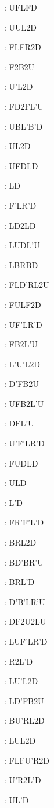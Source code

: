 \documentclass[9pt]{article}
\begin{document}
{\begin{multicols}{6}
: UFLFD

: UUL2D

: FLFR2D

: F2B2U

: U'L2D

: FD2FL'U

: UBL'B'D

: UL2D

: UFDLD

: LD

: F'LR'D

: LD2LD

: LUDL'U

: LBRBD

: FLD'RL2U

: FULF2D

: UF'LR'D

: FB2L'U

: L'U'L2D

: D'FB2U

: UFB2L'U

: DFL'U

: U'F'LR'D

: FUDLD

: ULD

: L'D

: FR'F'L'D

: BRL2D

: BD'BR'U

: BRL'D

: D'B'LR'U

: DF2U2LU

: LUF'LR'D

: R2L'D

: LU'L2D

: LD'FB2U

: BU'RL2D

: LUL2D

: FLFU'R2D

: U'R2L'D

: UL'D


\end{multicols}}
\end{document}
